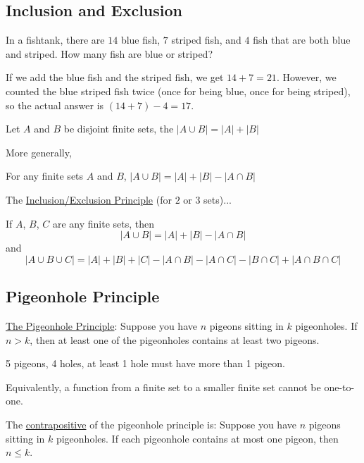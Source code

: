 \subsection{Inclusion and Exclusion}
\begin{example}
    In a fishtank, there are $14$ blue fish, $7$ striped fish, and $4$ fish that are both blue and striped. How many fish are blue or striped?

    If we add the blue fish and the striped fish, we get $14+7=21$. However, we counted the blue striped fish twice (once for being blue, once for being striped), so the actual answer is $(14+7)-4=17$.
\end{example}

\begin{theorm}
    Let $A$ and $B$ be disjoint finite sets, the $|A\cup B| = |A| + |B|$
\end{theorm}

More generally,
\newpage
\begin{theorm}
    For any finite sets $A$ and $B$, $|A\cup B| = |A|+|B| - |A\cap B|$
\end{theorm}

\begin{definition}
    The \underline{Inclusion/Exclusion Principle} (for $2$ or $3$ sets)...

    If $A$, $B$, $C$ are any finite sets, then
    $$|A\cup B| = |A| + |B| - |A\cap B|$$
    and
    $$|A\cup B\cup C| = |A| + |B| + |C| - |A\cap B| - |A\cap C| - |B\cap C| + |A\cap B\cap C|$$
\end{definition}

\subsection{Pigeonhole Principle}
\begin{definition}
    \underline{The Pigeonhole Principle}: Suppose you have $n$ pigeons sitting in $k$ pigeonholes. If $n > k$, then at least one of the pigeonholes contains at least two pigeons.

    \begin{example}
        5 pigeons, 4 holes, at least 1 hole must have more than 1 pigeon.
    \end{example}

    Equivalently, a function from a finite set to a smaller finite set cannot be one-to-one.
\end{definition}

The \underline{contrapositive} of the pigeonhole principle is: Suppose you have $n$ pigeons sitting in $k$ pigeonholes. If each pigeonhole contains at most one pigeon, then $n\leq k$.

